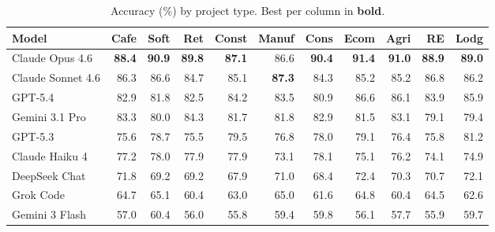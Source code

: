 \begin{table}[t]
\centering
\scriptsize
\caption{Accuracy (\%) by project type. Best per column in \textbf{bold}.}
\label{tab:by_project_type}
\begin{tabular}{lrrrrrrrrrr}
\toprule
Model & Cafe & Soft & Ret & Const & Manuf & Cons & Ecom & Agri & RE & Lodg \\
\midrule
Claude Opus 4.6 & \textbf{88.4} & \textbf{90.9} & \textbf{89.8} & \textbf{87.1} & 86.6 & \textbf{90.4} & \textbf{91.4} & \textbf{91.0} & \textbf{88.9} & \textbf{89.0} \\
Claude Sonnet 4.6 & 86.3 & 86.6 & 84.7 & 85.1 & \textbf{87.3} & 84.3 & 85.2 & 85.2 & 86.8 & 86.2 \\
GPT-5.4 & 82.9 & 81.8 & 82.5 & 84.2 & 83.5 & 80.9 & 86.6 & 86.1 & 83.9 & 85.9 \\
Gemini 3.1 Pro & 83.3 & 80.0 & 84.3 & 81.7 & 81.8 & 82.9 & 81.5 & 83.1 & 79.1 & 79.4 \\
GPT-5.3 & 75.6 & 78.7 & 75.5 & 79.5 & 76.8 & 78.0 & 79.1 & 76.4 & 75.8 & 81.2 \\
Claude Haiku 4 & 77.2 & 78.0 & 77.9 & 77.9 & 73.1 & 78.1 & 75.1 & 76.2 & 74.1 & 74.9 \\
DeepSeek Chat & 71.8 & 69.2 & 69.2 & 67.9 & 71.0 & 68.4 & 72.4 & 70.3 & 70.7 & 72.1 \\
Grok Code & 64.7 & 65.1 & 60.4 & 63.0 & 65.0 & 61.6 & 64.8 & 60.4 & 64.5 & 62.6 \\
Gemini 3 Flash & 57.0 & 60.4 & 56.0 & 55.8 & 59.4 & 59.8 & 56.1 & 57.7 & 55.9 & 59.7 \\
\bottomrule
\end{tabular}
\end{table}